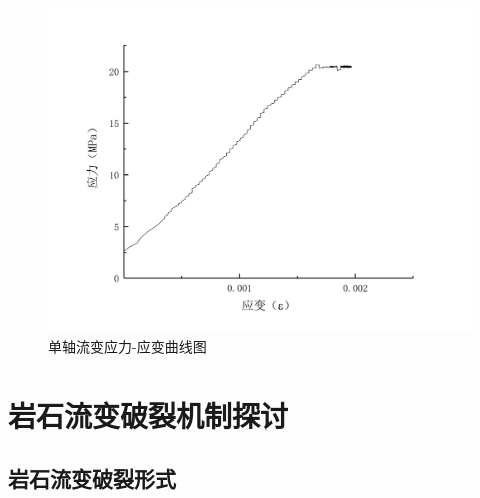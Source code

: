 \begin{figure}[ht!]
{\begin{minipage}{7cm}
            \includegraphics[width=1.1\textwidth]{img/chap2/stress-strain-C05.png}
        \end{minipage}
    }
    \centering
    \caption{单轴流变应力-应变曲线图}
    \label{fig:2-14}
\end{figure}

\section{岩石流变破裂机制探讨}
\subsection{岩石流变破裂形式}

